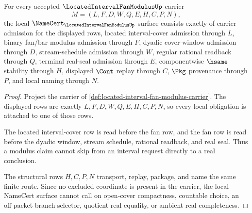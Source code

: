 \begin{theorem}
\label{thm:located-interval-fan-modulus-namecert-obligations}
For every accepted $\LocatedIntervalFanModulusUp$ carrier
$$
M=(L,F,D,W,Q,E,H,C,P,N),
$$
the local $\NameCert_{\LocatedIntervalFanModulusUp}$ surface consists exactly of carrier admission for the displayed rows, located interval-cover admission through $L$, binary fan/bar modulus admission through $F$, dyadic cover-window admission through $D$, stream-schedule admission through $W$, regular rational readback through $Q$, terminal real-seal admission through $E$, componentwise $\hsame$ stability through $H$, displayed $\Cont$ replay through $C$, $\Pkg$ provenance through $P$, and local naming through $N$.
\end{theorem}
\begin{proof}
Project the carrier of \autoref{def:located-interval-fan-modulus-carrier}. The displayed rows are exactly $L,F,D,W,Q,E,H,C,P,N$, so every local obligation is attached to one of those rows.

The located interval-cover row is read before the fan row, and the fan row is read before the dyadic window, stream schedule, rational readback, and real seal. Thus a modulus claim cannot skip from an interval request directly to a real conclusion.

The structural rows $H,C,P,N$ transport, replay, package, and name the same finite route. Since no excluded coordinate is present in the carrier, the local NameCert surface cannot call on open-cover compactness, countable choice, an off-packet branch selector, quotient real equality, or ambient real completeness.
\end{proof}

